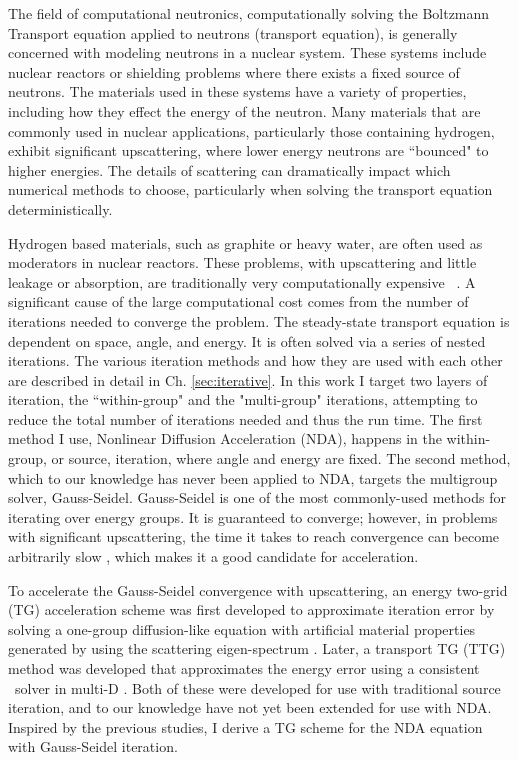 


The field of computational neutronics, computationally solving the Boltzmann Transport equation applied to neutrons (transport equation), is generally concerned with modeling neutrons in a nuclear system. These systems include nuclear reactors or shielding problems where there exists a fixed source of neutrons. The materials used in these systems have a variety of properties, including how they effect the energy of the neutron. Many materials that are commonly used in nuclear applications, particularly those containing hydrogen, exhibit significant upscattering, where lower energy neutrons are ``bounced" to higher energies. The details of scattering can dramatically impact which numerical methods to choose, particularly when solving the transport equation deterministically. 

Hydrogen based materials, such as graphite or heavy water, are often used as moderators in nuclear reactors. These problems, with upscattering and little leakage or absorption, are traditionally very computationally expensive ~\cite{morel-upscat}. A significant cause of the large computational cost comes from the number of iterations needed to converge the problem. The steady-state transport equation is dependent on space, angle, and energy. It is often solved via a series of nested iterations. The various iteration methods and how they are used with each other are described in detail in Ch. \ref{sec:iterative}. In this work I target two layers of iteration, the ``within-group" and the "multi-group" iterations, attempting to reduce the total number of iterations needed and thus the run time. The first method I use, Nonlinear Diffusion Acceleration (NDA), happens in the within-group, or source, iteration, where angle and energy are fixed. The second method, which to our knowledge has never been applied to NDA, targets the multigroup solver, Gauss-Seidel. Gauss-Seidel is one of the most commonly-used methods for iterating over energy groups. It is guaranteed to converge; however, in problems with significant upscattering, the time it takes to reach convergence can become arbitrarily slow \cite{evans-upscat}, which makes it a good candidate for acceleration. 

To accelerate the Gauss-Seidel convergence with upscattering, an energy two-grid (TG) acceleration scheme was first developed to approximate iteration error by solving a one-group diffusion-like equation with artificial material properties generated by using the scattering eigen-spectrum \cite{morel-upscat}. Later, a transport TG (TTG) method was developed that approximates the energy error using a consistent \sn\ solver in multi-D \cite{evans-upscat}. Both of these were developed for use with traditional source iteration, and to our knowledge have not yet been extended for use with NDA. Inspired by the previous studies, I derive a TG scheme for the NDA equation with Gauss-Seidel iteration.


